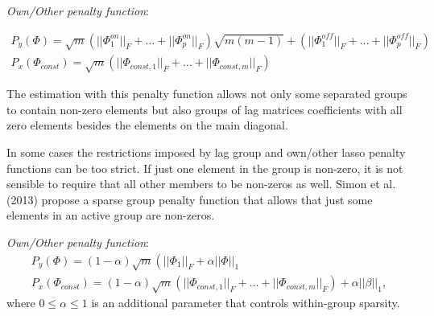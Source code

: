 \documentclass[12pt]{article} %
\begin{document}
\textit{Own/Other penalty function}:  

\begin{gather}
P_y(\Phi) = \sqrt{m} \left( ||\Phi_1^{on}||_{F}+\ldots + ||\Phi_p^{on}||_{F} \right) \sqrt{m(m-1)}+ \left( ||\Phi_1^{off}||_{F}+\ldots + ||\Phi_p^{off}||_{F} \right) \\
P_x(\Phi_{const})= \sqrt{m}  \left( ||\Phi_{const,1}||_{F}+\ldots + ||\Phi_{const,m}||_{F} \right)
\end{gather}

The estimation with this penalty function allows not only some separated groups to contain non-zero elements but also groups of lag matrices coefficients with all zero elements besides the elements on the main diagonal. 

In some cases the restrictions imposed by lag group and own/other lasso penalty functions can be too strict. If just one element in the group is non-zero, it is not sensible to require that all other members to be non-zeros as well. 
Simon et al.(2013) propose a sparse group penalty function that allows that just some elements in an active group are non-zeros.

\textit{Own/Other penalty function}:  
\begin{gather}
P_y(\Phi) = (1-\alpha) \sqrt{m} \left( ||\Phi_1||_{F}+\alpha||\Phi||_1\\
P_x(\Phi_{const})= (1-\alpha)\sqrt{m}  \left( ||\Phi_{const,1}||_{F}+\ldots + ||\Phi_{const,m}||_{F} \right)+\alpha ||\beta||_1,
\end{gather}
where $0\le \alpha \le 1$ is an additional parameter that controls within-group sparsity. 
\end{document}
